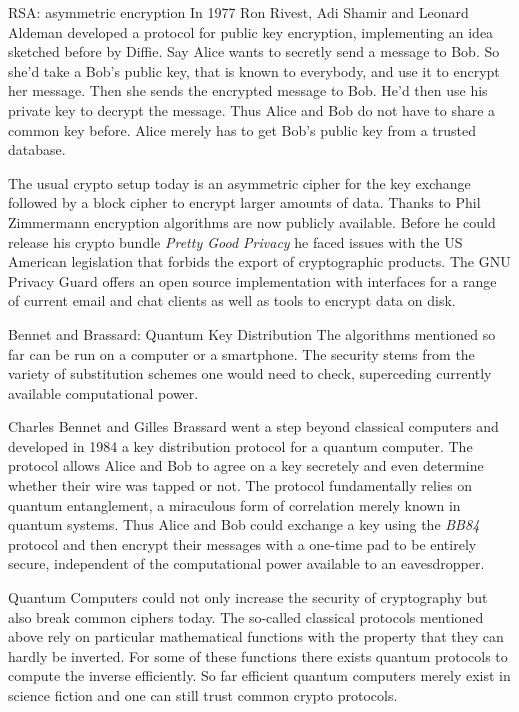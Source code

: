 \documentclass[final,hyperref={pdfpagelabels=false}]{beamer}
\begin{document}
\begin{frame}{}
\begin{columns}[t]
\begin{column}{.3\linewidth}
        \begin{block}{RSA: asymmetric encryption}
          In 1977 Ron Rivest, Adi Shamir and Leonard Aldeman developed a protocol for public key encryption, implementing an idea sketched before by Diffie. Say Alice wants to secretly send a message to Bob. So she'd take a Bob's public key, that is known to everybody, and use it to encrypt her message. Then she sends the encrypted message to Bob. He'd then use his private key to decrypt the message. Thus Alice and Bob do not have to share a common key before. Alice merely has to get Bob's public key from a trusted database. \par
          The usual crypto setup today is an asymmetric cipher for the key exchange followed by a block cipher to encrypt larger amounts of data. Thanks to Phil Zimmermann encryption algorithms are now publicly available. Before he could release his crypto bundle {\em Pretty Good Privacy} he faced issues with the US American legislation that forbids the export of cryptographic products. The GNU Privacy Guard offers an open source implementation with interfaces for a range of current email and chat clients as well as tools to encrypt data on disk.
        \end{block}

        \begin{block}{Bennet and Brassard: Quantum Key Distribution}
          The algorithms mentioned so far can be run on a computer or a smartphone. The security stems from the variety of substitution schemes one would need to check, superceding currently available computational power. \par 
          Charles Bennet and Gilles Brassard went a step beyond classical computers and developed in 1984 a key distribution protocol for a quantum computer. The protocol allows Alice and Bob to agree on a key secretely and even determine whether their wire was tapped or not. The protocol fundamentally relies on quantum entanglement, a miraculous form of correlation merely known in quantum systems. Thus Alice and Bob could exchange a key using the {\em BB84} protocol and then encrypt their messages with a one-time pad to be entirely secure, independent of the computational power available to an eavesdropper. \par
          Quantum Computers could not only increase the security of cryptography but also break common ciphers today. The so-called classical protocols mentioned above rely on particular mathematical functions with the property that they can hardly be inverted. For some of these functions there exists quantum protocols to compute the inverse efficiently. So far efficient quantum computers merely exist in science fiction and one can still trust common crypto protocols.
        \end{block}
      \end{column}
    \end{columns}
  \end{frame}
\end{document}

